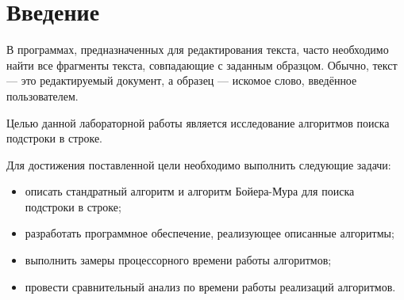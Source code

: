 \chapter*{Введение}

В программах, предназначенных для редактирования текста, часто необходимо найти 
все фрагменты текста, совпадающие с заданным образцом. Обычно, текст --- это редактируемый документ, 
а образец --- искомое слово, введённое пользователем.

Целью данной лабораторной работы является исследование алгоритмов поиска подстроки в строке.

Для достижения поставленной цели необходимо выполнить следующие задачи:
\begin{itemize}
    \item описать стандратный алгоритм и алгоритм Бойера-Мура для поиска подстроки в строке;
    \item разработать программное обеспечение, реализующее описанные алгоритмы;
    \item выполнить замеры процессорного времени работы алгоритмов;
	\item провести сравнительный анализ по времени работы реализаций алгоритмов.
\end{itemize}
